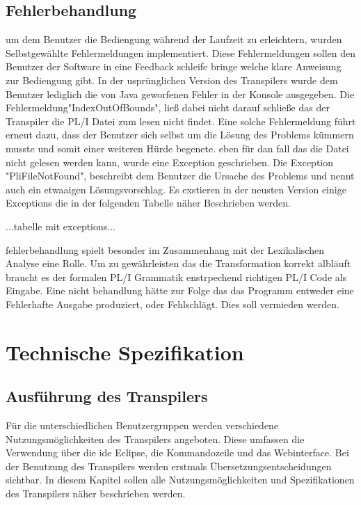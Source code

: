 \subsection{Fehlerbehandlung}
um dem Benutzer die Bediengung während der Laufzeit zu erleichtern, wurden Selbstgewählte Fehlermeldungen implementiert. Diese Fehlermeldungen sollen den Benutzer der Software in eine Feedback schleife bringe welche klare Anweisung zur Bediengung gibt. In der usprünglichen Version des Transpilers wurde dem Benutzer lediglich die von Java geworfenen Fehler in der Konsole ausgegeben. Die Fehlermeldung"IndexOutOfBounds", ließ dabei nicht darauf schließe das der Transpiler die PL/I Datei zum lesen nicht findet. Eine solche Fehlermeldung führt erneut dazu, dass der Benutzer sich selbst um die Lösung des Problems kümmern musste und somit einer weiteren Hürde begenete.
eben für dan fall das die Datei nicht gelesen werden kann, wurde eine Exception geschrieben. Die Exception "PliFileNotFound", beschreibt dem Benutzer die Ursache des Problems und nennt auch ein etwaaigen Lösungsvorschlag. Es exstieren in der neusten Version einige Exceptions die in der folgenden Tabelle näher Beschrieben werden.

...tabelle mit exceptions...

fehlerbehandlung spielt besonder im Zusammenhang mit der Lexikalischen Analyse eine Rolle. Um zu gewährleisten das die Transformation korrekt albläuft braucht es der formalen PL/I Grammatik enstrpechend richtigen PL/I Code als Eingabe. Eine nicht behandlung hätte zur Folge das das Programm entweder eine Fehlerhafte Ausgabe produziert, oder Fehlschlägt. Dies soll vermieden werden.

\pagebreak
\section{Technische Spezifikation}
\subsection{Ausführung des Transpilers}

Für die unterschiedlichen Benutzergruppen werden verschiedene Nutzungsmöglichkeiten des Transpilers angeboten. Diese umfassen die Verwendung über die \ac{ide} Eclipse, die Kommandozeile und das Webinterface. Bei der Benutzung des Transpilers werden erstmals Übersetzungsentscheidungen sichtbar. In diesem Kapitel sollen alle Nutzungsmöglichkeiten und Spezifikationen des Transpilers näher beschrieben werden.


